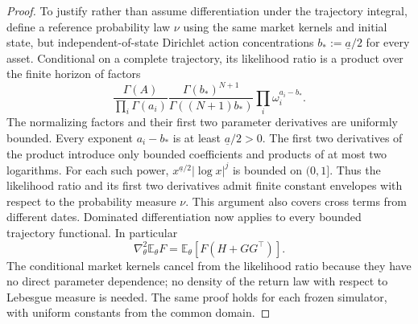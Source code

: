 \documentclass[11pt]{article}
\newcommand{\E}{\mathbb E}
\newcommand{\1}{\mathbf 1}
\theoremstyle{definition}
\begin{document}
\begin{proof}
To justify rather than assume differentiation under the trajectory integral, define a reference probability law $\nu$ using the same market kernels and initial state, but independent-of-state Dirichlet action concentrations $b_*:=\underline a/2$ for every asset. Conditional on a complete trajectory, its likelihood ratio is a product over the finite horizon of factors
\[
 \frac{\Gamma(A)}{\prod_i\Gamma(a_i)}
 \frac{\Gamma(b_*)^{N+1}}{\Gamma((N+1)b_*)}
 \prod_i\omega_i^{a_i-b_*}.
\]
The normalizing factors and their first two parameter derivatives are uniformly bounded. Every exponent $a_i-b_*$ is at least $\underline a/2>0$. The first two derivatives of the product introduce only bounded coefficients and products of at most two logarithms. For each such power, $x^{\underline a/2}|\log x|^j$ is bounded on $(0,1]$. Thus the likelihood ratio and its first two derivatives admit finite constant envelopes with respect to the probability measure $\nu$. This argument also covers cross terms from different dates. Dominated differentiation now applies to every bounded trajectory functional. In particular
\begin{equation}\label{eq:second-likelihood-interface}
 \nabla_\theta^2\E_\theta F
 =\E_\theta[F(H+GG^\top)].
\end{equation}
The conditional market kernels cancel from the likelihood ratio because they have no direct parameter dependence; no density of the return law with respect to Lebesgue measure is needed. The same proof holds for each frozen simulator, with uniform constants from the common domain.
\end{proof}
\end{document}
